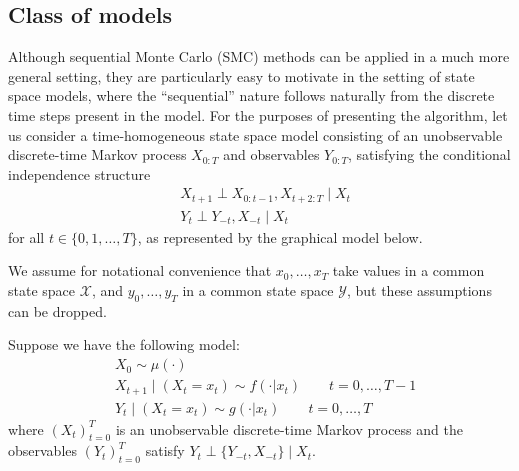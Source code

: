 \documentclass[fleqn]{article}
\newcommand{\indep}{\perp}
\begin{document}
\subsection{Class of models}
Although sequential Monte Carlo (SMC) methods can be applied in a much more general setting, they are particularly easy to motivate in the setting of state space models, where the ``sequential'' nature follows naturally from the discrete time steps present in the model. 
For the purposes of presenting the algorithm, let us consider a time-homogeneous state space model consisting of an unobservable discrete-time Markov process $X_{0:T}$ and observables $Y_{0:T}$, satisfying the conditional independence structure
\begin{align*}
& X_{t+1} \perp X_{0:t-1}, X_{t+2:T} \mid X_t \\
& Y_t \perp Y_{-t}, X_{-t} \mid X_t
\end{align*}
for all $t \in \{0,1,\dots, T\}$, as represented by the graphical model below.

\begin{center}
\end{center}

We assume for notational convenience that $x_0,\dots,x_T$ take values in a common state space $\mathcal{X}$, and $y_0,\dots,y_T$ in a common state space $\mathcal{Y}$, but these assumptions can be dropped. 

Suppose we have the following model:
\begin{align*}
& X_0 \sim \mu(\cdot) \\
& X_{t+1} \mid (X_t = x_t) \sim f(\cdot | x_t)  \qquad t=0,\dots,T-1 \\
& Y_t \mid (X_t = x_t) \sim g(\cdot | x_t) \qquad t=0,\dots,T
\end{align*}
where $(X_t)_{t=0}^T$ is an unobservable discrete-time Markov process and the observables $(Y_t)_{t=0}^T$ satisfy $Y_t \indep \{Y_{-t}, X_{-t}\} \mid X_t$. 
\end{document}
